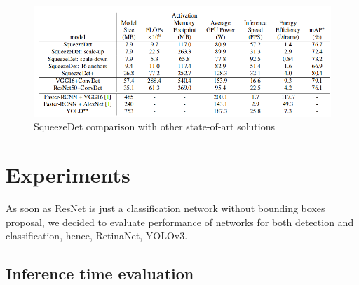 \documentclass[twoside]{ctuthesis}
\theoremstyle{plain}
\theoremstyle{definition}
\theoremstyle{note}
\begin{document}
\begin{figure}[h]
\caption{SqueezeDet comparison with other state-of-art solutions}
\label{squeezedet_comparasion}
\includegraphics[width=\textwidth]{images/used_networks/squeezedet_comparation.png}
\end{figure}

\chapter{Experiments}

As soon as ResNet is just a classification network without bounding boxes proposal, we decided to evaluate performance of networks for both detection and classification, hence, RetinaNet, YOLOv3.
\section{Inference time evaluation}
\end{document}
